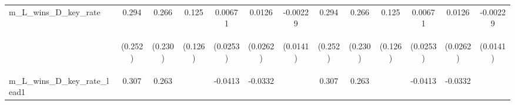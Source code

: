 \documentclass[]{article}
\begin{document}
\begin{center}
\begin{tabular}{lcccccccccccc}
m\_L\_wins\_D\_key\_rate & 0.294 & 0.266 & 0.125 & 0.00671 & 0.0126 & -0.00229 & 0.294 & 0.266 & 0.125 & 0.00671 & 0.0126 & -0.00229 \\
\vspace{4pt} & \begin{footnotesize}(0.252)\end{footnotesize} & \begin{footnotesize}(0.230)\end{footnotesize} & \begin{footnotesize}(0.126)\end{footnotesize} & \begin{footnotesize}(0.0253)\end{footnotesize} & \begin{footnotesize}(0.0262)\end{footnotesize} & \begin{footnotesize}(0.0141)\end{footnotesize} & \begin{footnotesize}(0.252)\end{footnotesize} & \begin{footnotesize}(0.230)\end{footnotesize} & \begin{footnotesize}(0.126)\end{footnotesize} & \begin{footnotesize}(0.0253)\end{footnotesize} & \begin{footnotesize}(0.0262)\end{footnotesize} & \begin{footnotesize}(0.0141)\end{footnotesize} \\
m\_L\_wins\_D\_key\_rate\_lead1 & 0.307 & 0.263 &  & -0.0413 & -0.0332 &  & 0.307 & 0.263 &  & -0.0413 & -0.0332 &  \\

\end{tabular}
\end{center}
\end{document}
